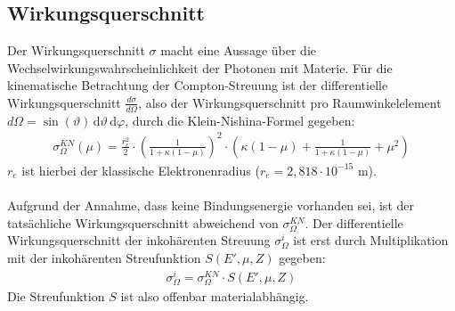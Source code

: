 \documentclass[german,  %
parskip=full,  %
]{scrartcl}
\begin{document}
\subsection{Wirkungsquerschnitt}
Der Wirkungsquerschnitt $\sigma$ macht eine Aussage über die Wechselwirkungswahrscheinlichkeit der Photonen mit Materie. Für die kinematische Betrachtung der Compton-Streuung ist der differentielle Wirkungsquerschnitt $\frac{d\sigma}{d\Omega}$, also der Wirkungsquerschnitt pro Raumwinkelelement $d\Omega = \sin(\vartheta) \, \mathrm{d}\vartheta \, \mathrm{d}\varphi$, durch die Klein-Nishina-Formel gegeben:
\begin{align}
\label{klein}
\sigma_{\Omega}^{KN}(\mu) = \frac{r_{e}^2}{2} \cdot \left(\frac{1}{1+\kappa(1-\mu)}\right)^2 \cdot \left(\kappa(1-\mu)+\frac{1}{1+\kappa(1-\mu)}+\mu^2\right)
\end{align}
$r_{e}$ ist hierbei der klassische Elektronenradius ($r_{e} = 2,818 \cdot 10^{-15}$ m).
\\\\
Aufgrund der Annahme, dass keine Bindungsenergie vorhanden sei, ist der tatsächliche Wirkungsquerschnitt abweichend von $\sigma_{\Omega}^{KN}$. Der differentielle Wirkungsquerschnitt der inkohärenten Streuung $\sigma_{\Omega}^{i}$ ist erst durch Multiplikation mit der inkohärenten Streufunktion $S(E', \mu, Z)$ gegeben:
\begin{align}
\sigma_{\Omega}^{i} = \sigma_{\Omega}^{KN} \cdot  S(E', \mu, Z)
\end{align}
Die Streufunktion $S$ ist also offenbar materialabhängig.
\end{document}
